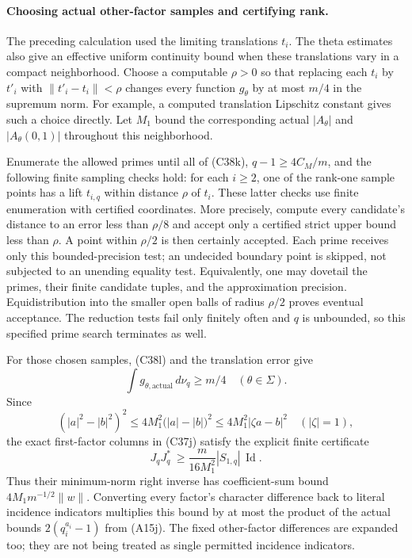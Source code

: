 \paragraph{Choosing actual other-factor samples and certifying rank.}
The preceding calculation used the limiting translations $t_i$.
The theta estimates also give an effective uniform continuity
bound when these translations vary in a compact neighborhood.
Choose a computable $\rho>0$ so that replacing each $t_i$ by
$t'_i$ with $\|t'_i-t_i\|<\rho$ changes every function
$g_\theta$ by at most $m/4$ in the supremum norm.  For example,
a computed translation Lipschitz constant gives such a choice
directly.  Let $M_1$ bound the corresponding actual
$|A_\theta|$ and $|A_\theta(0,1)|$ throughout this neighborhood.

Enumerate the allowed primes until all of (C38k),
$q-1\ge4C_M/m$, and the following finite sampling checks hold:
for each $i\ge2$, one of the rank-one sample points has a lift
$t_{i,q}$ within distance $\rho$ of $t_i$.  These latter
checks use finite enumeration with certified coordinates.  More
precisely, compute every candidate's distance to an error less
than $\rho/8$ and accept only a certified strict upper bound
less than $\rho$.  A point within $\rho/2$ is then certainly
accepted.  Each prime receives only this bounded-precision test;
an undecided boundary point is skipped, not subjected to an
unending equality test.  Equivalently, one may dovetail the
primes, their finite candidate tuples, and the approximation
precision.  Equidistribution into the smaller open balls of
radius $\rho/2$ proves eventual acceptance.  The reduction
tests fail only finitely often and $q$ is unbounded, so this
specified prime search terminates as well.

For those chosen samples, (C38l) and the translation error give
\[
                 \int g_{\theta,\mathrm{actual}}\,d\nu_q\ge m/4
                          \quad(\theta\in\Sigma).
 \tag{C38m}
\]
Since
\[
 (|a|^2-|b|^2)^2
       \le4M_1^2\bigl(|a|-|b|\bigr)^2
       \le4M_1^2|\zeta a-b|^2\quad(|\zeta|=1),
\]
the exact first-factor columns in (C37j) satisfy the explicit
finite certificate
\[
             J_qJ_q^*\ \ge
             \frac{m}{16M_1^2}|S_{1,q}|\,\operatorname{Id}.
 \tag{C38n}
\]
Thus their minimum-norm right inverse has coefficient-sum bound
$4M_1m^{-1/2}\|w\|$.  Converting every factor's character
difference back to literal incidence indicators multiplies this
bound by at most the product of the actual bounds
$2(q_i^{a_i}-1)$ from (A15j).  The fixed other-factor differences
are expanded too; they are not being treated as single permitted
incidence indicators.

